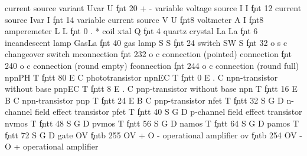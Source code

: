 {current source variant}
\cdefiv       Uvar  U     \c*fnt    20          + -
 {variable voltage source}
\cdef         I     I     \c*fnt    12
 {current source}
\cdef         Ivar  I     \c*fnt    14
 {variable current source}
\cdef         V     U     {\def\add*cmds{\clr*acmds
                           \ac*{\symfont V}}\c*fnt}8
 {voltmeter}
\cdef         A     I     {\def\add*cmds{\clr*acmds
                           \ac*{\symfont A}}\c*fnt}8
 {amperemeter}
\cdefiv       L     L     \c*fnt     0          . *
 {coil}
\cdef         xtal  Q     \c*fnt     4
 {quartz crystal}
\cdef         La    La    \c*fnt     6
 {incandescent lamp} %
\cdef         GasLa {}   \c*fnt     40
 {gas lamp}
\cdef         S     S     \c*fnt    24
 {switch}
\cdefviii     SW    S     \c*fnt    32          o s c
 {changeover switch}
\cdefivNL     mconnection \c*fnt   232          o c
 {connection (pointed)}
\cdefivNL     connection  \c*fnt   240          o c
 {connection (round empty)}
\cdefivNL     fconnection \c*fnt   244          o c
 {connection (round full)}
\cdefiviv npnPH T \c*fntt 80 E C
 {phototransistor}
\cdefviii     npnEC T     \c*fntt    0          E . C
 {npn-transistor without base}
\cdefviii     pnpEC T     \c*fntt    8          E . C
 {pnp-transistor without base}
\cdefviii     npn   T     \c*fntt   16          E B C
 {npn-transistor}
\cdefviii     pnp   T     \c*fntt   24          E B C
 {pnp-transistor}
\cdefviii     nfet  T     \c*fntt   32          S G D
 {n-channel field effect transistor}
\cdefviii     pfet  T     \c*fntt   40          S G D
 {p-channel field effect transistor}
\cdefviii     nvmos T     \c*fntt   48          S G D
 {}
\cdefviii     pvmos T     \c*fntt   56          S G D
 {}
\cdefviii     namos T     \c*fntt   64          S G D
 {}
\cdefviii     pamos T     \c*fntt   72          S G D
 {}
\pagebreak
\optionline gate
\gateIIO      OV          \c*fntb  255 \ldd*OV  + O -
 {operational amplifier}
\gateIIO      ov          \c*fntb  254 \ldd*OV  - O +
 {operational amplifier}

